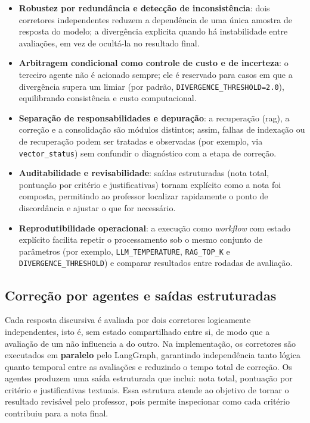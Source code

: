 \begin{itemize}
    \item \textbf{Robustez por redundância e detecção de inconsistência}: dois corretores independentes reduzem a dependência de uma única amostra de resposta do modelo; a divergência explicita quando há instabilidade entre avaliações, em vez de ocultá-la no resultado final.
    \item \textbf{Arbitragem condicional como controle de custo e de incerteza}: o terceiro agente não é acionado sempre; ele é reservado para casos em que a divergência supera um limiar (por padrão, \texttt{DIVERGENCE\_THRESHOLD=2.0}), equilibrando consistência e custo computacional.
    \item \textbf{Separação de responsabilidades e depuração}: a recuperação (\gls{rag}), a correção e a consolidação são módulos distintos; assim, falhas de indexação ou de recuperação podem ser tratadas e observadas (por exemplo, via \texttt{vector\_status}) sem confundir o diagnóstico com a etapa de correção.
    \item \textbf{Auditabilidade e revisabilidade}: saídas estruturadas (nota total, pontuação por critério e justificativas) tornam explícito como a nota foi composta, permitindo ao professor localizar rapidamente o ponto de discordância e ajustar o que for necessário.
    \item \textbf{Reprodutibilidade operacional}: a execução como \textit{workflow} com estado explícito facilita repetir o processamento sob o mesmo conjunto de parâmetros (por exemplo, \texttt{LLM\_TEMPERATURE}, \texttt{RAG\_TOP\_K} e \texttt{DIVERGENCE\_THRESHOLD}) e comparar resultados entre rodadas de avaliação.
\end{itemize}

\subsection{Correção por agentes e saídas estruturadas}

Cada resposta discursiva é avaliada por dois corretores logicamente independentes, isto é, sem estado compartilhado entre si, de modo que a avaliação de um não influencia a do outro. Na implementação, os corretores são executados em \textbf{paralelo} pelo LangGraph, garantindo independência tanto lógica quanto temporal entre as avaliações e reduzindo o tempo total de correção. Os agentes produzem uma saída estruturada que inclui: nota total, pontuação por critério e justificativas textuais. Essa estrutura atende ao objetivo de tornar o resultado revisável pelo professor, pois permite inspecionar como cada critério contribuiu para a nota final.

